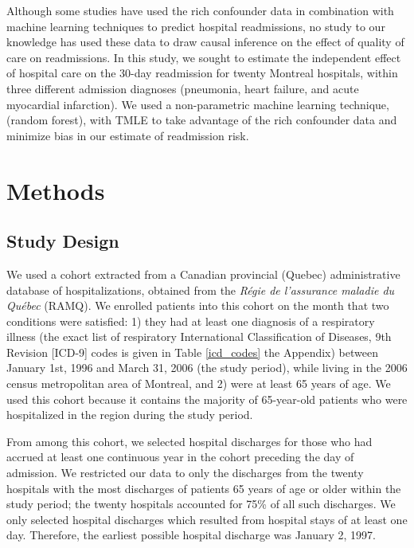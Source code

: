 \documentclass[]{article}\usepackage[]{graphicx}\usepackage[]{color}
\begin{document}
Although some studies have used the rich confounder data in combination with machine learning techniques to predict hospital readmissions\supercite{he_mining_2014, hosseinzadeh_assessing_2013}, no study to our knowledge has used these data to draw causal inference on the effect of quality of care on readmissions. In this study, we sought to estimate the independent effect of hospital care on the 30-day readmission for twenty Montreal hospitals, within three different admission diagnoses (pneumonia, heart failure, and acute myocardial infarction). We used a non-parametric machine learning technique, (random forest\supercite{breiman_random_2001}), with TMLE to take advantage of the rich confounder data and minimize bias in our estimate of readmission risk.

\section{Methods}

\subsection{Study Design}
We used a cohort extracted from a Canadian provincial (Quebec) administrative database of hospitalizations, obtained from the \emph{Régie de l'assurance maladie du Québec} (RAMQ). We enrolled patients into this cohort on the month that two conditions were satisfied: 1) they had at least one diagnosis of a respiratory illness (the exact list of respiratory International Classification of Diseases, 9th Revision [ICD-9] codes is given in Table \ref{icd_codes} the Appendix) between January 1st, 1996 and March 31, 2006 (the study period), while living in the 2006 census metropolitan area of Montreal, and 2) were at least 65 years of age. We used this cohort because it contains the majority of 65-year-old patients who were hospitalized in the region during the study period.

From among this cohort, we selected hospital discharges for those who had accrued at least one continuous year in the cohort preceding the day of admission. We restricted our data to only the discharges from the twenty hospitals with the most discharges of patients 65 years of age or older within the study period; the twenty hospitals accounted for 75\% of all such discharges.  We only selected hospital discharges which resulted from hospital stays of at least one day. Therefore, the earliest possible hospital discharge was January 2, 1997.
\end{document}
